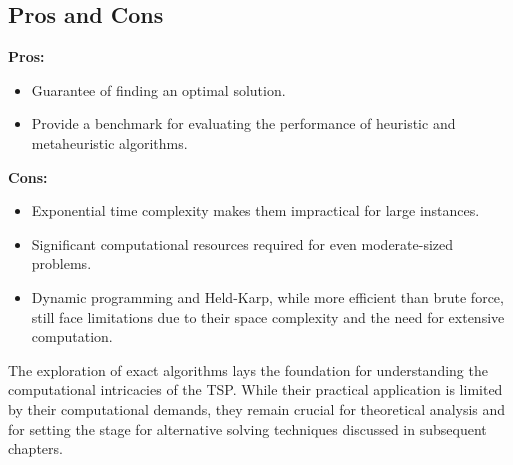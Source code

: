 \subsection{Pros and Cons}

\textbf{Pros:}
\begin{itemize}
	\item Guarantee of finding an optimal solution.
	\item Provide a benchmark for evaluating the performance of heuristic and metaheuristic algorithms.
\end{itemize}

\textbf{Cons:}
\begin{itemize}
	\item Exponential time complexity makes them impractical for large instances.
	\item Significant computational resources required for even moderate-sized problems.
	\item Dynamic programming and Held-Karp, while more efficient than brute force, still face limitations due to their space complexity and the need for extensive computation.
\end{itemize}

The exploration of exact algorithms lays the foundation for understanding the computational intricacies of the TSP. While their practical application is limited by their computational demands, they remain crucial for theoretical analysis and for setting the stage for alternative solving techniques discussed in subsequent chapters.
